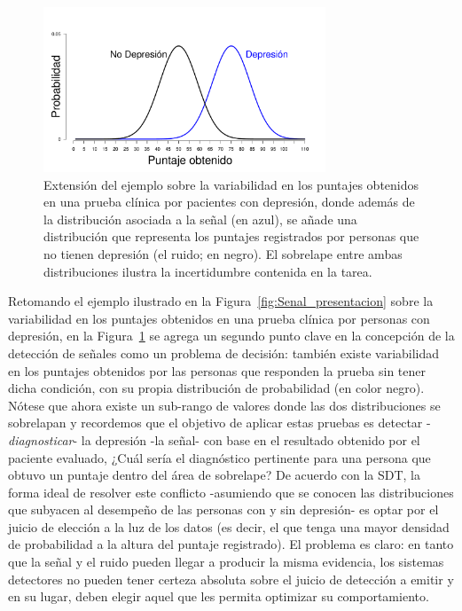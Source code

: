 \begin{figure}[h]
\centering
\includegraphics[width=0.75\textwidth]{Figures/Noise} 
\caption[Variabilidad en la señal y en el ruido]{Extensión del ejemplo sobre la variabilidad en los puntajes obtenidos en una prueba clínica por pacientes con depresión, donde además de la distribución asociada a la señal (en azul), se añade una distribución que representa los puntajes registrados por personas que no tienen depresión (el ruido; en negro). El sobrelape entre ambas distribuciones ilustra la incertidumbre contenida en la tarea.}
\label{fig:Noise}
\end{figure}

Retomando el ejemplo ilustrado en la Figura~\ref{fig:Senal_presentacion} sobre la variabilidad en los puntajes obtenidos en una prueba clínica por personas con depresión, en la Figura~\ref{fig:Noise} se agrega un segundo punto clave en la concepción de la detección de señales como un problema de decisión: también existe variabilidad en los puntajes obtenidos por las personas que responden la prueba sin tener dicha condición, con su propia distribución de probabilidad (en color negro). Nótese que ahora existe un sub-rango de valores donde las dos distribuciones se sobrelapan y recordemos que el objetivo de aplicar estas pruebas es detectar -\textit{diagnosticar}- la depresión -la señal- con base en el resultado obtenido por el paciente evaluado, ¿Cuál sería el diagnóstico pertinente para una persona que obtuvo un puntaje dentro del área de sobrelape? De acuerdo con la SDT, la forma ideal de resolver este conflicto -asumiendo que se conocen las distribuciones que subyacen al desempeño de las personas con y sin depresión- es optar por el juicio de elección  a la luz de los datos (es decir, el que tenga una mayor densidad de probabilidad a la altura del puntaje registrado). El problema es claro: en tanto que la señal y el ruido pueden llegar a producir la misma evidencia, los sistemas detectores no pueden tener certeza absoluta sobre el juicio de detección a emitir y en su lugar, deben elegir aquel que les permita optimizar su comportamiento.\\ 

